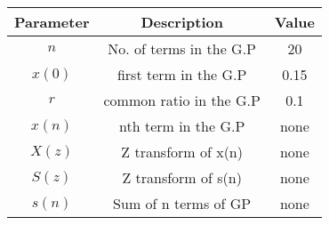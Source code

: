\renewcommand{\arraystretch}{1.5}
\begin{tabular}{|c|c|c|}
\hline
Parameter & Description & Value \\\hline
\( n \) & No. of terms in the G.P &20 \\\hline
\(x(0) \) & first term in the G.P&0.15 \\\hline
\( r \) & common ratio in the G.P& 0.1 \\\hline
\( x(n) \) & nth term in the G.P& none \\\hline
\( X(z) \) & Z transform of x(n)& none \\\hline
\( S(z) \) & Z transform of s(n)& none \\\hline
\(s(n)\)& Sum of n terms of GP& none\\\hline
\end{tabular}
